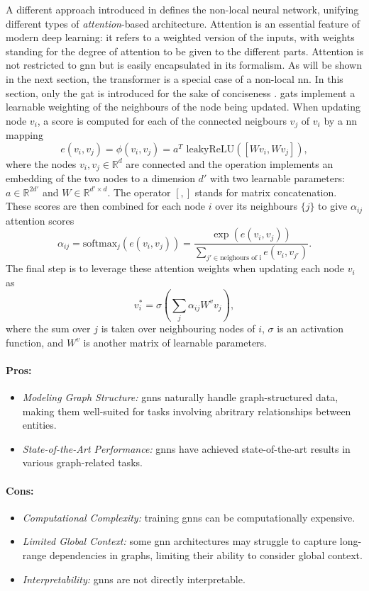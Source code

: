 A different approach introduced in \cite{nlnnPaper} defines the non-local neural network, unifying different types of \textit{attention}-based architecture. Attention is an essential feature of modern deep learning: it refers to a weighted version of the inputs, with weights standing for the degree of attention to be given to the different parts. Attention is not restricted to \gls{gnn} but is easily encapsulated in its formalism. As will be shown in the next section, the transformer is a special case of a non-local \gls{nn}. In this section, only the \gls{gat} is introduced for the sake of conciseness \cite{velickovic2018graph}. \glspl{gat} implement a learnable weighting of the neighbours of the node being updated. When updating node $v_i$, a score is computed for each of the connected neigbours $v_j$ of $v_i$ by a \gls{nn} mapping \[e(v_i, v_j) = \phi(v_i, v_j) = a^T \text{ leakyReLU}([W v_i, Wv_j]),\] where the nodes $v_i, v_j \in \mathbb{R}^d$ are connected and the operation implements an embedding of the two nodes to a dimension $d'$ with two learnable parameters: $a \in \mathbb{R}^{2d'}$ and $W \in \mathbb{R}^{d' \times d}$. The operator $[,]$ stands for matrix concatenation. These scores are then combined for each node $i$ over its neighbours $\{j\}$ to give $\alpha_{ij}$ attention scores \[ \alpha_{ij} = \text{softmax}_j (e(v_i, v_j)) = \frac{\exp(e(v_i, v_j))}{\sum_{j' \in \text{neighours of i}}e(v_i, v_{j'})}.\] The final step is to leverage these attention weights when updating each node $v_i$ as \[v^*_i = \sigma\left(\sum_{j} \alpha_{ij} W^v v_j \right),\] where the sum over $j$ is taken over neighbouring nodes of $i$, $\sigma$ is an activation function, and $W^v$ is another matrix of learnable parameters.

\paragraph{Pros:}
\begin{itemize}
    \item \textit{Modeling Graph Structure:} \glspl{gnn} naturally handle graph-structured data, making them well-suited for tasks involving abritrary relationships between entities.
    \item \textit{State-of-the-Art Performance:} \glspl{gnn} have achieved state-of-the-art results in various graph-related tasks.
\end{itemize}

\paragraph{Cons:}
\begin{itemize}
    \item \textit{Computational Complexity:} training \glspl{gnn} can be computationally expensive.
    \item \textit{Limited Global Context:} some \gls{gnn} architectures may struggle to capture long-range dependencies in graphs, limiting their ability to consider global context.
    \item \textit{Interpretability:} \glspl{gnn} are not directly interpretable.
\end{itemize}


